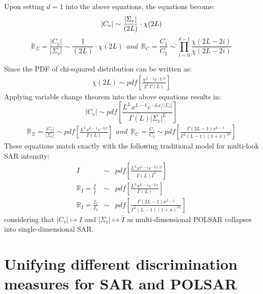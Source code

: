 \documentclass[]{tRSL2e}
\begin{document}
Upon setting $d=1$ into the above equations,
  the equations become:
\begin{equation}
  |C_v| \sim { \frac{|\Sigma_v|}{(2L)} \cdot \chi (2L) }\\ %
  \end{equation}
\begin{equation}
  \mathbb{R}_{\Sigma} = \frac{|C_v|}{|\Sigma_v|} \sim \frac{1}{(2L)} \cdot \chi(2L) ~~and~~
\mathbb{R}_{C} = \frac{C_1}{C_2} \sim \prod_{i=0}^{d-1} \frac{\chi(2L-2i)}{\chi(2L-2i)}
\end{equation}

Since the PDF of chi-squared distribution can be written as:
\begin{align*}
\chi(2L) \sim pdf \left[ \frac{\chi^{L-1}e^{-\chi/2}}{2^L\Gamma(L)} \right]
\end{align*}
Applying variable change theorem into the above equations results in:
\begin{equation}
  |C_v| \sim  pdf \left[ \frac{L^L x^{L-1} e^{-Lx/|\Sigma_v|}}{\Gamma(L) |\Sigma_v|^L} \right] \nonumber %
  \end{equation}
  \vspace{-6mm}
\begin{align*}
  \mathbb{R}_{\Sigma} = \frac{|C_v|}{|\Sigma_v|} \sim pdf \left[ \frac{ L^{L} x^{L-1} e^{-Lx}}{ \Gamma(L)} \right]  ~~and~~
  \mathbb{R}_{C} = \frac{C_1}{C_2} \sim pdf \left[ \frac{\Gamma(2L-1) x^{L-1}}{\Gamma^2(L-1) (1+x)^{2L}} \right]
\end{align*}
%
These equations match exactly with the following traditional model for multi-look SAR intensity:
  \begin{eqnarray}
I &\sim& pdf \left[ \frac{L^L x^{L-1} e^{-Lx/\bar{I}}}{\Gamma(L) \bar{I}^L} \right] \\
\mathbb{R}_{\bar{I}} = \frac{I}{\bar{I}} &\sim& pdf \left[ \frac{ L^{L} x^{L-1} e^{-Lx}}{ \Gamma(L)} \label{eqn:multi_look_SAR_ratio_dist} \right] \\
  \mathbb{R}_{I} = \frac{I_1}{I_2} &\sim& pdf \left[ \frac{\Gamma(2L-1) x^{L-1}}{\Gamma^2(L-1) (1+x)^{2L}} \right]
  \end{eqnarray}
considering that $|C_v| \mapsto I$ and $|\Sigma_v| \mapsto \bar{I}$ as multi-dimensional POLSAR collapses into single-dimensional SAR.
  
\section{Unifying different discrimination measures for SAR and POLSAR}
\label{sec:link_sar_polsar}
\end{document}

